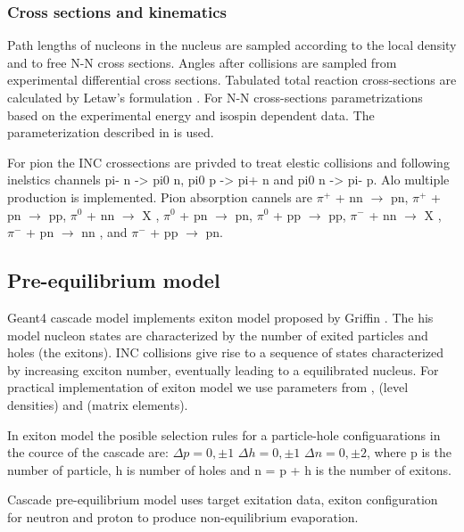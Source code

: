 \subsubsection{Cross sections and kinematics}

Path lengths of nucleons in the nucleus are sampled according to the local density and to free N-N cross sections.
Angles after collisions are sampled from experimental differential cross sections.
Tabulated total reaction cross-sections are calculated by Letaw's formulation \cite{letaw83, letaw93, pearlstein89}.
For N-N cross-sections parametrizations based on the experimental energy and isospin dependent data. 
The parameterization described in \cite{barashenkov72} is used. 

For pion the INC crossections are privded to treat elestic collisions and following inelstics channels
pi- n -> pi0 n,
pi0 p -> pi+ n and
 pi0 n -> pi- p.
Alo multiple production is implemented.
Pion absorption cannels are 
$\pi^{+}$ + nn $\rightarrow$ pn, $\pi^{+}$ + pn $\rightarrow$ pp, 
$\pi^{0}$ + nn $\rightarrow$ X , $\pi^{0}$ + pn $\rightarrow$ pn,      $\pi^{0}$ + pp $\rightarrow$ pp, 
$\pi^{-}$ + nn $\rightarrow$ X , $\pi^{-}$ + pn $\rightarrow$ nn , and $\pi^{-}$ + pp $\rightarrow$ pn.
\subsection{Pre-equilibrium model}

{\sc Geant4} cascade model implements exiton model proposed by Griffin \cite{griffin66, griffin67}.
The his model nucleon states are characterized by the number of exited particles and holes (the exitons).
INC collisions give rise to a sequence of states characterized by increasing exciton number, eventually leading to a equilibrated nucleus.
For practical implementation of exiton model we use parameters  from \cite{ribansky73}, (level densities) and \cite{kalbach78}  
(matrix elements).

In exiton model the posible selection rules for a particle-hole configuarations in the cource of the cascade are:
$\Delta p = 0, \pm 1$  $\Delta h = 0, \pm 1$  $\Delta n = 0, \pm 2$,
where p is the number of particle, h is number of holes and n = p + h is the number of exitons. 

Cascade pre-equilibrium model uses target exitation data, 
exiton configuration for neutron and proton to produce non-equilibrium evaporation.



